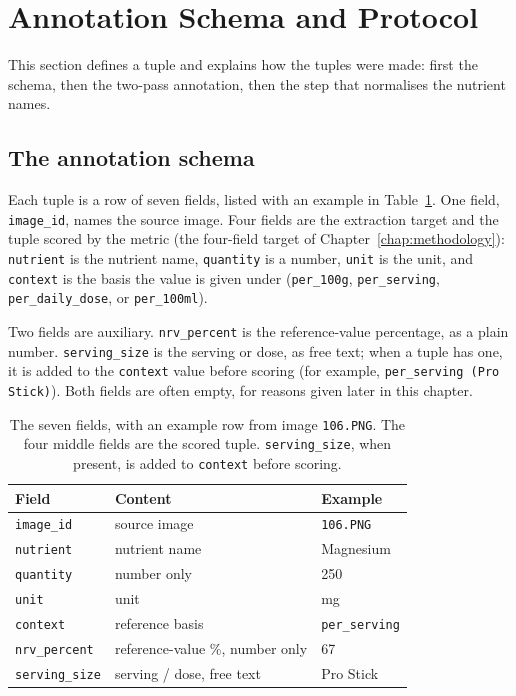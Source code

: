 \FloatBarrier

\section{Annotation Schema and Protocol}\label{sec:schema}

This section defines a tuple and explains how the tuples were made: first
the schema, then the two-pass annotation, then the step that normalises the
nutrient names.

\subsection{The annotation schema}\label{sec:schema-tuple}

Each tuple is a row of seven fields, listed with an example in
Table~\ref{tab:schema}. One field, \texttt{image\_id}, names the source
image. Four fields are the extraction target and the tuple scored by the
metric (the four-field target of Chapter~\ref{chap:methodology}):
\texttt{nutrient} is the nutrient name, \texttt{quantity} is a number,
\texttt{unit} is the unit, and \texttt{context} is the basis the value is
given under (\texttt{per\_100g}, \texttt{per\_serving},
\texttt{per\_daily\_dose}, or \texttt{per\_100ml}).

Two fields are auxiliary. \texttt{nrv\_percent} is the reference-value
percentage, as a plain number. \texttt{serving\_size} is the serving or
dose, as free text; when a tuple has one, it is added to the
\texttt{context} value before scoring (for example,
\texttt{per\_serving (Pro Stick)}). Both fields are often empty, for reasons
given later in this chapter.

\begin{table}[tb]
  \centering
  \caption[The annotation schema]{%
    The seven fields, with an example row from image \texttt{106.PNG}. The
    four middle fields are the scored tuple. \texttt{serving\_size}, when
    present, is added to \texttt{context} before scoring.}
  \label{tab:schema}
  \begin{tabular}{lll}
    \toprule
    Field & Content & Example \\
    \midrule
    \texttt{image\_id}     & source image                    & \texttt{106.PNG}      \\
    \texttt{nutrient}      & nutrient name                   & Magnesium             \\
    \texttt{quantity}      & number only                     & 250                   \\
    \texttt{unit}          & unit                            & mg                    \\
    \texttt{context}       & reference basis                 & \texttt{per\_serving} \\
    \addlinespace
    \texttt{nrv\_percent}  & reference-value \%, number only & 67                    \\
    \texttt{serving\_size} & serving / dose, free text       & Pro Stick             \\
    \bottomrule
  \end{tabular}
\end{table}

